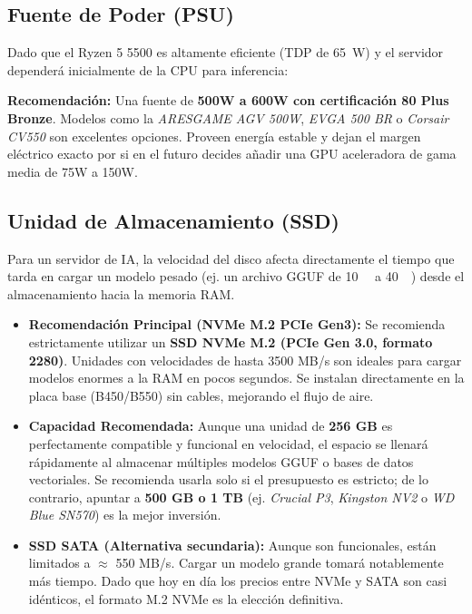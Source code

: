 \documentclass[11pt,a4paper]{article}
\begin{document}
\subsection{Fuente de Poder (PSU)}

Dado que el Ryzen 5 5500 es altamente eficiente (TDP de \SI{65}{\watt}) y el servidor dependerá inicialmente de la CPU para inferencia:

\begin{tcolorbox}[cajaRecomendacion, title={\faIcon{bolt}~Fuente de Poder (PSU)}]
\textbf{Recomendación:} Una fuente de \textbf{500W a 600W con certificación 80 Plus Bronze}. Modelos como la \textit{ARESGAME AGV 500W}, \textit{EVGA 500 BR} o \textit{Corsair CV550} son excelentes opciones. Proveen energía estable y dejan el margen eléctrico exacto por si en el futuro decides añadir una GPU aceleradora de gama media de 75W a 150W.
\end{tcolorbox}

\subsection{Unidad de Almacenamiento (SSD)}

Para un servidor de IA, la velocidad del disco afecta directamente el tiempo que tarda en cargar un modelo pesado (ej. un archivo GGUF de \SI{10}{\giga\byte} a \SI{40}{\giga\byte}) desde el almacenamiento hacia la memoria RAM.

\begin{tcolorbox}[cajaRecomendacion, title={\faIcon{hdd}~Almacenamiento (SSD)}]
\begin{itemize}
    \item \textbf{Recomendación Principal (NVMe M.2 PCIe Gen3):} Se recomienda estrictamente utilizar un \textbf{SSD NVMe M.2 (PCIe Gen 3.0, formato 2280)}. Unidades con velocidades de hasta 3500 MB/s son ideales para cargar modelos enormes a la RAM en pocos segundos. Se instalan directamente en la placa base (B450/B550) sin cables, mejorando el flujo de aire.
    \item \textbf{Capacidad Recomendada:} Aunque una unidad de \textbf{256 GB} es perfectamente compatible y funcional en velocidad, el espacio se llenará rápidamente al almacenar múltiples modelos GGUF o bases de datos vectoriales. Se recomienda usarla solo si el presupuesto es estricto; de lo contrario, apuntar a \textbf{500 GB o 1 TB} (ej. \textit{Crucial P3}, \textit{Kingston NV2} o \textit{WD Blue SN570}) es la mejor inversión.
    \item \textbf{SSD SATA (Alternativa secundaria):} Aunque son funcionales, están limitados a $\approx$ 550 MB/s. Cargar un modelo grande tomará notablemente más tiempo. Dado que hoy en día los precios entre NVMe y SATA son casi idénticos, el formato M.2 NVMe es la elección definitiva.
\end{itemize}
\end{tcolorbox}
\end{document}
